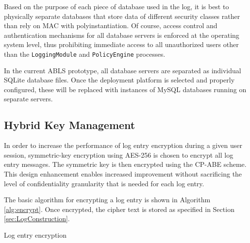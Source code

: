 \documentclass{sig-alternate}
\begin{document}
Based on the purpose of each piece of database used in the log, it is best to physically separate databases
that store data of different security classes rather than rely on MAC with polyinstantiation. Of course, access control
and authentication mechanisms for all database servers is enforced at the operating system level, thus
prohibiting immediate access to all unauthorized users other than the {\tt LoggingModule} and {\tt PolicyEngine} 
processes. 

In the current ABLS prototype, all database servers are separated as individual SQLite database files. Once
the deployment platform is selected and properly configured, these will be replaced with instances of MySQL 
databases running on separate servers.

\subsection{Hybrid Key Management}
\label{sec:keyMgmt}
In order to increase the performance of log entry encryption during a given user session, symmetric-key encryption
using AES-256 is chosen to encrypt all log entry messages. The symmetric key is then encrypted using the CP-ABE
scheme. This design enhancement enables increased improvement without sacrificing the level of confidentiality 
granularity that is needed for each log entry. 

The basic algorithm for encrypting a log entry is shown in Algorithm \ref{alg:encrypt}. Once encrypted, the cipher text
is stored as specified in Section \ref{sec:LogConstruction}.

\begin{algorithm}[ht!] %
\caption{Log entry encryption} \label{alg:encrypt}
\begin{algorithmic}[1]

\ENDIF
{}
\end{algorithmic}
\end{algorithm}
\end{document}
